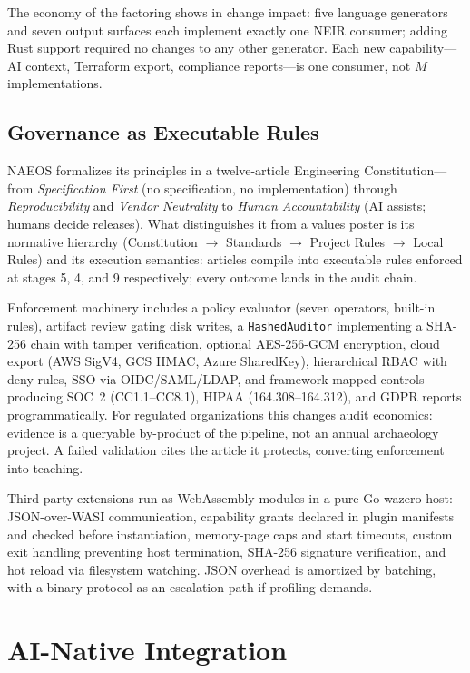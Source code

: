 \documentclass[sigconf,nonacm]{acmart}
\begin{document}
The economy of the factoring shows in change impact: five language generators and seven output surfaces each implement exactly one NEIR consumer; adding Rust support required no changes to any other generator. Each new capability---AI context, Terraform export, compliance reports---is one consumer, not $M$ implementations.

\subsection{Governance as Executable Rules}
\label{sec:governance}
NAEOS formalizes its principles in a twelve-article Engineering Constitution---from \emph{Specification First} (no specification, no implementation) through \emph{Reproducibility} and \emph{Vendor Neutrality} to \emph{Human Accountability} (AI assists; humans decide releases). What distinguishes it from a values poster is its normative hierarchy (Constitution $\rightarrow$ Standards $\rightarrow$ Project Rules $\rightarrow$ Local Rules) and its execution semantics: articles compile into executable rules enforced at stages 5, 4, and 9 respectively; every outcome lands in the audit chain.

Enforcement machinery includes a policy evaluator (seven operators, built-in rules), artifact review gating disk writes, a \texttt{HashedAuditor} implementing a SHA-256 chain with tamper verification, optional AES-256-GCM encryption, cloud export (AWS SigV4, GCS HMAC, Azure SharedKey), hierarchical RBAC with deny rules, SSO via OIDC/SAML/LDAP, and framework-mapped controls producing SOC~2 (CC1.1--CC8.1), HIPAA (164.308--164.312), and GDPR reports programmatically. For regulated organizations this changes audit economics: evidence is a queryable by-product of the pipeline, not an annual archaeology project. A failed validation cites the article it protects, converting enforcement into teaching.

Third-party extensions run as WebAssembly modules in a pure-Go wazero host: JSON-over-WASI communication, capability grants declared in plugin manifests and checked before instantiation, memory-page caps and start timeouts, custom exit handling preventing host termination, SHA-256 signature verification, and hot reload via filesystem watching. JSON overhead is amortized by batching, with a binary protocol as an escalation path if profiling demands.

\section{AI-Native Integration}
\label{sec:ai}
\end{document}
